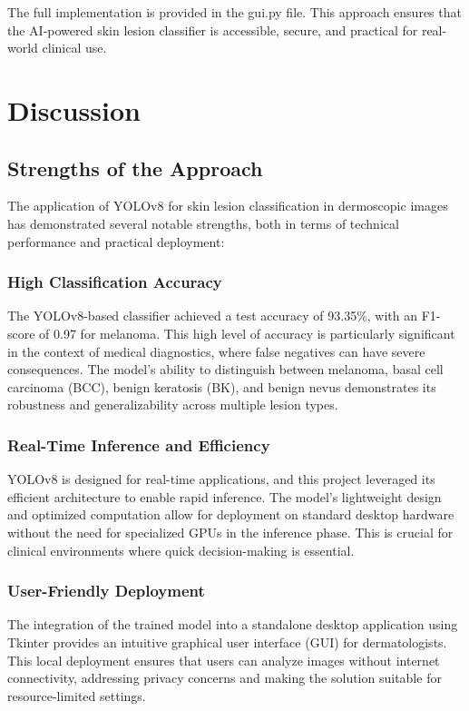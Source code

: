 \documentclass[a4paper,12pt]{report}
\begin{document}
\begin{spacing}{1.5}
    The full implementation is provided in the gui.py file. This approach ensures that the AI-powered skin lesion classifier is accessible, secure, and practical for real-world clinical use.
    
\chapter{Discussion}

    \section{Strengths of the Approach}
    
    The application of YOLOv8 for skin lesion classification in dermoscopic images has demonstrated several notable strengths, both in terms of technical performance and practical deployment:
    
        \subsection*{High Classification Accuracy}
        The YOLOv8-based classifier achieved a test accuracy of 93.35\%, with an F1-score of 0.97 for melanoma. This high level of accuracy is particularly significant in the context of medical diagnostics, where false negatives can have severe consequences. The model’s ability to distinguish between melanoma, basal cell carcinoma (BCC), benign keratosis (BK), and benign nevus demonstrates its robustness and generalizability across multiple lesion types.
        
        \subsection*{Real-Time Inference and Efficiency}
        YOLOv8 is designed for real-time applications, and this project leveraged its efficient architecture to enable rapid inference. The model’s lightweight design and optimized computation allow for deployment on standard desktop hardware without the need for specialized GPUs in the inference phase. This is crucial for clinical environments where quick decision-making is essential.
        
        \subsection*{User-Friendly Deployment}
        The integration of the trained model into a standalone desktop application using Tkinter provides an intuitive graphical user interface (GUI) for dermatologists. This local deployment ensures that users can analyze images without internet connectivity, addressing privacy concerns and making the solution suitable for resource-limited settings.
        

\end{spacing}
\end{document}
